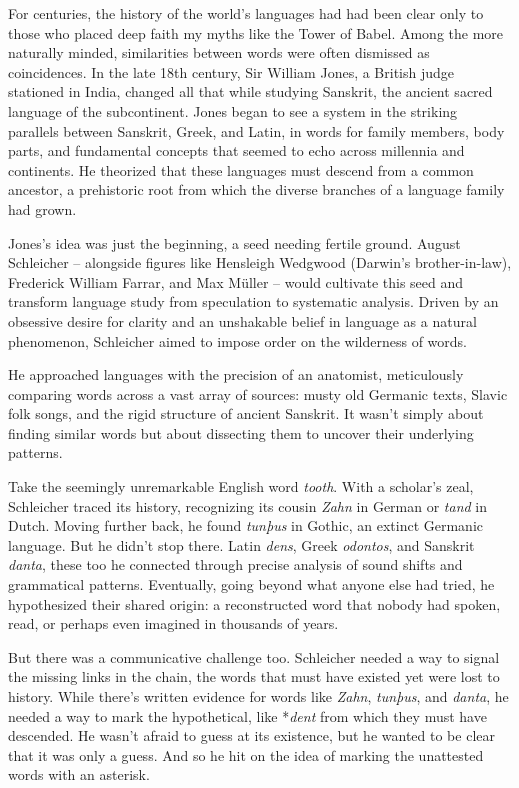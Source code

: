 \bigskip

For centuries, the history of the world's languages had had been clear only to those who placed deep faith my myths like the Tower of Babel. Among the more naturally minded, similarities between words were often dismissed as coincidences. In the late 18th century, Sir William Jones, a British judge stationed in India, changed all that while studying Sanskrit, the ancient sacred language of the subcontinent. Jones began to see a system in the striking parallels between Sanskrit, Greek, and Latin, in words for family members, body parts, and fundamental concepts that seemed to echo across millennia and continents. He theorized that these languages must descend from a common ancestor, a prehistoric root from which the diverse branches of a language family had grown.

Jones's idea was just the beginning, a seed needing fertile ground. August Schleicher -- alongside figures like Hensleigh Wedgwood (Darwin's brother-in-law), Frederick William Farrar, and Max Müller -- would cultivate this seed and transform language study from speculation to systematic analysis. Driven by an obsessive desire for clarity and an unshakable belief in language as a natural phenomenon, Schleicher aimed to impose order on the wilderness of words.

He approached languages with the precision of an anatomist, meticulously comparing words across a vast array of sources: musty old Germanic texts, Slavic folk songs, and the rigid structure of ancient Sanskrit. It wasn't simply about finding similar words but about dissecting them to uncover their underlying patterns.

Take the seemingly unremarkable English word \textit{tooth}. With a scholar's zeal, Schleicher traced its history, recognizing its cousin \textit{Zahn} in German or \textit{tand} in Dutch. Moving further back, he found \textit{tunþus} in Gothic, an extinct Germanic language. But he didn't stop there. Latin \textit{dens}, Greek \textit{odontos}, and Sanskrit \textit{danta}, these too he connected through precise analysis of sound shifts and grammatical patterns. Eventually, going beyond what anyone else had tried, he hypothesized their shared origin: a reconstructed word that nobody had spoken, read, or perhaps even imagined in thousands of years.

But there was a communicative challenge too. Schleicher needed a way to signal the missing links in the chain, the words that must have existed yet were lost to history. While there's written evidence for words like \textit{Zahn}, \textit{tunþus}, and \textit{danta}, he needed a way to mark the hypothetical, like *\textit{dent} from which they must have descended. He wasn't afraid to guess at its existence, but he wanted to be clear that it was only a guess. And so he hit on the idea of marking the unattested words with an asterisk.

